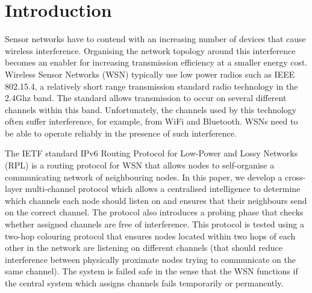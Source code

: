 \section{Introduction}
\label{sec:introduction}
Sensor networks have to contend with an increasing number of devices that cause wireless interference. Organising the network topology around this interference becomes an enabler for increasing transmission efficiency at a smaller energy cost. Wireless Sensor Networks (WSN) typically use low power radios such as IEEE 802.15.4, a relatively short range transmission standard radio technology in the 2.4Ghz band. The standard allows transmission to occur on several different channels within this band.  Unfortunately, the channels used by this technology often suffer interference, for example, from WiFi and Bluetooth. WSNs need to be able to operate reliably in the presence of such interference.  

The IETF standard IPv6 Routing Protocol for Low-Power and Lossy Networks (RPL) is a routing protocol for WSN that allows nodes to self-organise a communicating network of neighbouring nodes. In this paper, we develop a cross-layer multi-channel protocol which allows a centralised intelligence to determine which channels each node should listen on and ensures that their neighbours send on the correct channel. The protocol also introduces a probing phase that checks whether assigned channels are free of interference.  This protocol is tested using a two-hop colouring protocol that ensures nodes located within two hops of each other in the network are listening on different channels (that should reduce interference between physically proximate nodes trying to communicate on the same channel).  The system is failed safe in the sense that the WSN functions if the central system which assigns channels fails temporarily or permanently.

